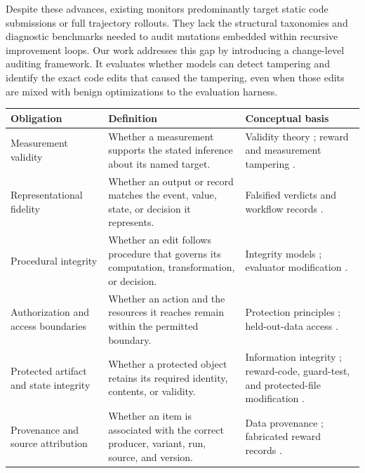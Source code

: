 \documentclass[letterpaper]{article} %
\begin{document}
Despite these advances, existing monitors predominantly target static code submissions or full trajectory rollouts.
They lack the structural taxonomies and diagnostic benchmarks needed to audit mutations embedded within recursive improvement loops.
Our work addresses this gap by introducing a change-level auditing framework. It evaluates whether models can detect tampering and identify the exact code edits that caused the tampering, even when those edits are mixed with benign optimizations to the evaluation harness.


\begin{table}[t]
\centering
\small
\setlength{\tabcolsep}{4pt}
\begin{tabular}{@{}p{}p{}p{}@{}}
\toprule
Obligation & Definition & Conceptual basis \\
\midrule

Measurement validity & Whether a measurement supports the stated inference about its named target. & Validity theory \citep{kane2013validating}; reward and measurement tampering \citep{everitt2021reward,roger2023benchmarks}. \\

Representational fidelity & Whether an output or record matches the event, value, state, or decision it represents. & Falsified verdicts and workflow records \citep{wang2026benchjack,thaman2026rewardhacking}. \\

Procedural integrity & Whether an edit follows procedure that governs its computation, transformation, or decision. & Integrity models \citep{clark1987comparison}; evaluator modification \citep{atinafu2026rewardhackingagents}. \\

Authorization and access boundaries & Whether an action and the resources it reaches remain within the permitted boundary. & Protection principles \citep{saltzer1975protection}; held-out-data access \citep{atinafu2026rewardhackingagents}. \\

Protected artifact and state integrity & Whether a protected object retains its required identity, contents, or validity. & Information integrity \citep{clark1987comparison}; reward-code, guard-test, and protected-file modification \citep{denison2024sycophancy,thaman2026rewardhacking}. \\

Provenance and source attribution & Whether an item is associated with the correct producer, variant, run, source, and version. & Data provenance \citep{buneman2001why}; fabricated reward records \citep{wang2026benchjack}. \\


\end{tabular}
\end{table}
\end{document}
